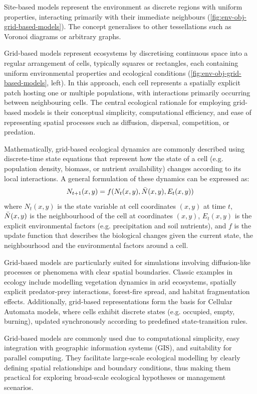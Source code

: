 Site-based models represent the environment as discrete regions with uniform properties, interacting primarily with their immediate neighbours (\cref{fig:env-obj-grid-based-models}). The concept generalises to other tessellations such as Voronoi diagrams or arbitrary graphs.


Grid-based models represent ecosystems by discretising continuous space into a regular arrangement of cells, typically squares or rectangles, each containing uniform environmental properties and ecological conditions (\cref{fig:env-obj-grid-based-models}, left). In this approach, each cell represents a spatially explicit patch hosting one or multiple populations, with interactions primarily occurring between neighbouring cells. The central ecological rationale for employing grid-based models is their conceptual simplicity, computational efficiency, and ease of representing spatial processes such as diffusion, dispersal, competition, or predation.

Mathematically, grid-based ecological dynamics are commonly described using discrete-time state equations that represent how the state of a cell (e.g. population density, biomass, or nutrient availability) changes according to its local interactions. A general formulation of these dynamics can be expressed as:
\begin{align}
N_{t+1}(x,y) = f(N_t(x,y), \Bar{N}(x, y), E_t(x, y))
\end{align}
where $N_t(x, y)$ is the state variable at cell coordinates $(x, y)$ at time $t$, $\Bar{N}(x, y)$ is the neighbourhood of the cell at coordinates $(x, y)$, $E_t(x, y)$ is the explicit environmental factors (e.g. precipitation and soil nutrients), and $f$ is the update function that describes the biological changes given the current state, the neighbourhood and the environmental factors around a cell.

Grid-based models are particularly suited for simulations involving diffusion-like processes or phenomena with clear spatial boundaries. Classic examples in ecology include modelling vegetation dynamics in arid ecosystems, spatially explicit predator-prey interactions, forest-fire spread, and habitat fragmentation effects. Additionally, grid-based representations form the basis for Cellular Automata models, where cells exhibit discrete states (e.g. occupied, empty, burning), updated synchronously according to predefined state-transition rules.

Grid-based models are commonly used due to computational simplicity, easy integration with geographic information systems (GIS), and suitability for parallel computing. They facilitate large-scale ecological modelling by clearly defining spatial relationships and boundary conditions, thus making them practical for exploring broad-scale ecological hypotheses or management scenarios.

